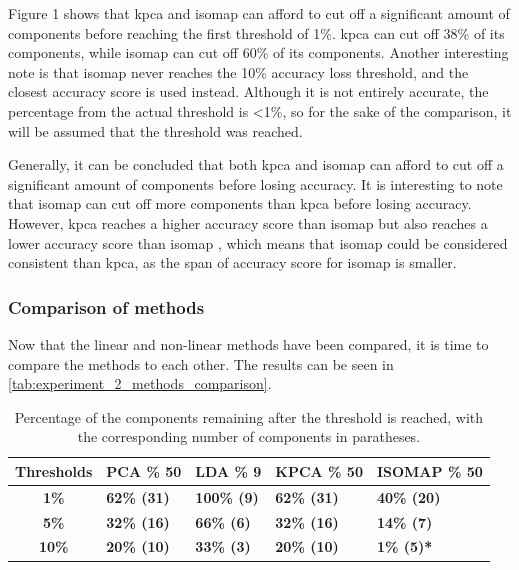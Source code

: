 Figure 1 shows that \gls{kpca} and \gls{isomap}  can afford to cut off a significant amount of components before reaching the first threshold of 1\%. \gls{kpca} can cut off 38\% of its components, while \gls{isomap}  can cut off 60\% of its components. Another interesting note is that \gls{isomap}  never reaches the 10\% accuracy loss threshold, and the closest accuracy score is used instead. Although it is not entirely accurate, the percentage from the actual threshold is <1\%, so for the sake of the comparison, it will be assumed that the threshold was reached.

Generally, it can be concluded that both \gls{kpca} and \gls{isomap}  can afford to cut off a significant amount of components before losing accuracy. It is interesting to note that \gls{isomap}  can cut off more components than \gls{kpca} before losing accuracy. However, \gls{kpca} reaches a higher accuracy score than \gls{isomap}  but also reaches a lower accuracy score than \gls{isomap} , which means that \gls{isomap}  could be considered consistent than kpca, as the span of accuracy score for \gls{isomap}  is smaller.


\subsubsection{Comparison of methods}
Now that the linear and non-linear methods have been compared, it is time to compare the methods to each other. The results can be seen in \autoref{tab:experiment_2_methods_comparison}.


\begin{table}[htb!]
    \centering
    \begin{tabular}{cp{}p{}p{}p{}}
        \toprule
        \textbf{Thresholds} & \textbf{PCA \% 50} & \textbf{LDA \% 9} & \textbf{KPCA \% 50} & \textbf{ISOMAP \% 50} \\ \midrule
        \textbf{1\%} & \textbf{62\% (31)} & \textbf{100\% (9)} & \textbf{62\% (31)} & \textbf{40\% (20)} \\
        \textbf{5\%} & \textbf{32\% (16)} & \textbf{66\% (6)} & \textbf{32\% (16)} & \textbf{14\% (7)} \\
        \textbf{10\%} & \textbf{20\% (10)} & \textbf{33\% (3)} & \textbf{20\% (10)} & \textbf{1\% (5)*} \\
        \bottomrule
    \end{tabular}
    \caption{Percentage of the components remaining after the threshold is reached, with the corresponding number of components in paratheses.}
    \label{tab:experiment_2_methods_comparison}
\end{table}

